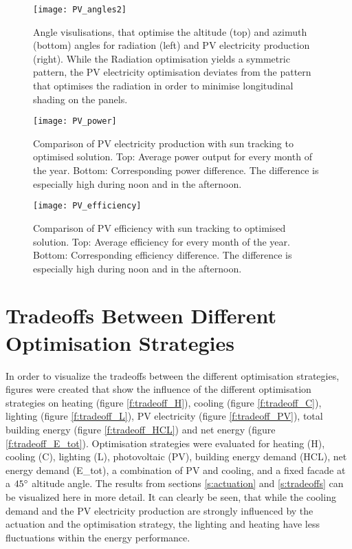 	\begin{figure*}[hb]
		\begin{center}
		\texttt{[image: PV\_angles2]}
		\caption{Angle visulisations, that optimise the altitude (top) and azimuth (bottom) angles for radiation (left) and PV electricity production (right). While the Radiation optimisation yields a symmetric pattern, the PV electricity optimisation deviates from the pattern that optimises the radiation in order to minimise longitudinal shading on the panels.}
		\label{f:PV_angles}
		\end{center}
	\end{figure*}

	\begin{figure*}
		\begin{center}
		\texttt{[image: PV\_power]}
		\caption{Comparison of PV electricity production with sun tracking to optimised solution. Top: Average power output for every month of the year. Bottom: Corresponding power difference. The difference is especially high during noon and in the afternoon.}
		\label{f:PV_power}
		\end{center}
	\end{figure*}

	\begin{figure*}
		\begin{center}
		\texttt{[image: PV\_efficiency]}
		\caption{Comparison of PV efficiency with sun tracking to optimised solution. Top: Average efficiency for every month of the year. Bottom: Corresponding efficiency difference. The difference is especially high during noon and in the afternoon.}
		\label{f:PV_efficiency}
		\end{center}
	\end{figure*}

	\cleardoublepage

\section{Tradeoffs Between Different Optimisation Strategies}
\label{a:tradeoffs}
	
	In order to visualize the tradeoffs between the different optimisation strategies, figures were created that show the influence of the different optimisation strategies on heating (figure \ref{f:tradeoff_H}), cooling (figure \ref{f:tradeoff_C}), lighting (figure \ref{f:tradeoff_L}), PV electricity (figure \ref{f:tradeoff_PV}), total building energy (figure \ref{f:tradeoff_HCL}) and net energy (figure \ref{f:tradeoff_E_tot}). Optimisation strategies were evaluated for heating (H), cooling (C), lighting (L), photovoltaic (PV), building energy demand (HCL), net energy demand (E\_tot), a combination of PV and cooling, and a fixed facade at a $45\degree$ altitude angle. The results from sections \ref{s:actuation} and \ref{s:tradeoffs} can be visualized here in more detail. It can clearly be seen, that while the cooling demand and the PV electricity production are strongly influenced by the actuation and the optimisation strategy, the lighting and heating have less fluctuations within the energy performance. 

